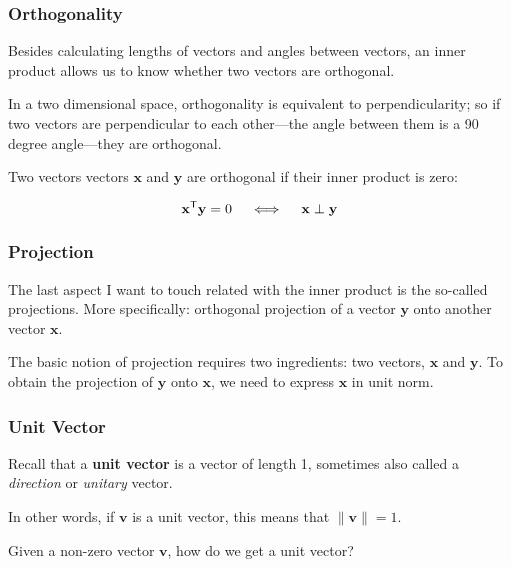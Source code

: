 \documentclass[12pt]{beamer}\usepackage[]{graphicx}\usepackage[]{color}
\begin{document}
\begin{frame}
\frametitle{Orthogonality}

Besides calculating lengths of vectors and angles between vectors, an inner 
product allows us to know whether two vectors are orthogonal. 

\bigskip
In a two dimensional space, orthogonality is equivalent to perpendicularity; 
so if two vectors are perpendicular to each 
other---the angle between them is a 90 degree angle---they are orthogonal. 


\bigskip
Two vectors vectors $\mathbf{x}$ and $\mathbf{y}$ 
are orthogonal if their inner product is zero:

$$
\mathbf{x^\mathsf{T} y} = 0 \quad \iff \quad \mathbf{x} \hspace{1mm} \bot \hspace{1mm} \mathbf{y} 
$$

\end{frame}


\begin{frame}
\frametitle{Projection}

The last aspect I want to touch related with the inner product is the so-called 
projections. More specifically: orthogonal projection of a 
vector $\mathbf{y}$ onto another vector $\mathbf{x}$. 

\bigskip
The basic notion of projection requires two ingredients: two vectors, 
$\mathbf{x}$ and $\mathbf{y}$. To obtain the projection of $\mathbf{y}$ onto 
$\mathbf{x}$, we need to express $\mathbf{x}$ in unit norm.

\end{frame}


\begin{frame}
\frametitle{Unit Vector}

Recall that a \textbf{unit vector} is a vector of length 1, sometimes 
also called a \textit{direction} or \textit{unitary} vector.

\bigskip
In other words, if $\mathbf{v}$ is a unit vector, this means that $\| \mathbf{v} \| = 1$. 

\bigskip
{\lit Given a non-zero vector $\mathbf{v}$, how do we get a unit vector?}

\end{frame}

\end{document}
